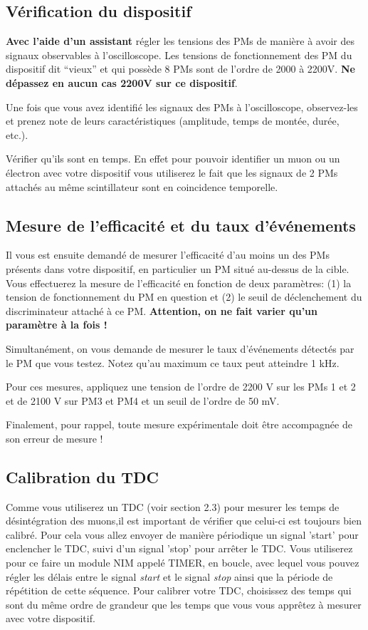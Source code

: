 \subsection{Vérification du dispositif}
\textbf{Avec l'aide d'un assistant} régler les tensions des PMs de manière à 
avoir des signaux observables \`a l'oscilloscope. Les tensions de fonctionnement des PM du dispositif dit ``vieux'' et qui possède 8 PMs sont de l'ordre de 2000 à 2200V. \textbf{Ne dépassez en aucun cas 2200V sur ce dispositif}.

Une fois que vous avez identifi\'e les signaux des PMs à l'oscilloscope, observez-les et prenez note de leurs caract\'eristiques (amplitude, temps de 
mont\'ee, dur\'ee, etc.).

Vérifier qu'ils sont en temps. En effet pour pouvoir identifier un muon ou un \'electron
avec votre dispositif vous utiliserez le fait que les signaux de
2 PMs attach\'es au m\^eme scintillateur sont en coincidence temporelle.

\subsection{Mesure de l'efficacité et du taux d'événements}

Il vous est ensuite demandé de mesurer l'efficacité d'au moins un des PMs 
présents dans votre dispositif, en particulier un PM situ\'e au-dessus de la 
cible. Vous effectuerez la mesure de l'efficacité en fonction de deux paramètres: (1) la tension de fonctionnement du PM en question et (2) le seuil de 
déclenchement du discriminateur attaché à ce PM.
\textbf{Attention, on ne fait varier qu'un paramètre à la fois !}

Simultanément, on vous demande de mesurer le taux d'événements détectés par le 
PM que vous testez. Notez qu'au maximum ce taux peut atteindre 1 kHz.

Pour ces mesures, appliquez une tension de l’ordre de 2200 V sur les PMs 1 et 2 et de 2100 V sur PM3 et PM4 et un seuil de l'ordre de 50 mV.

Finalement, pour rappel, toute mesure expérimentale doit être accompagnée de son erreur de mesure !

\subsection{Calibration du TDC}
Comme vous utiliserez un TDC (voir section 2.3) pour mesurer les temps de désintégration des muons,il est important de vérifier que celui-ci est toujours bien calibré. Pour cela vous 
allez envoyer de manière périodique un signal 'start' pour enclencher le TDC, suivi d'un signal 'stop' pour arrêter le TDC. Vous utiliserez pour ce faire un module NIM appelé TIMER, en boucle, avec lequel vous pouvez régler les délais entre
le signal \textit{start} et le signal \textit{stop} ainsi que la période de répétition de cette séquence.
Pour calibrer votre TDC, choisissez des temps qui sont du même ordre de grandeur 
que les temps que vous vous apprêtez à mesurer avec votre dispositif.

